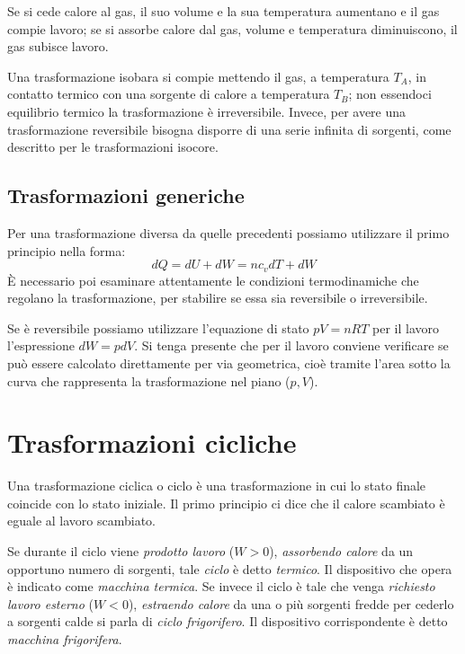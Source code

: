 \documentclass[class=book, crop=false, oneside, 12pt]{standalone}
\begin{document}
Se si cede calore al gas, il suo volume e la sua temperatura aumentano e il gas compie lavoro; se si assorbe calore dal gas, volume e temperatura diminuiscono, il gas subisce lavoro.

Una trasformazione isobara si compie mettendo il gas, a temperatura \(T_A\), in contatto termico con una sorgente di calore a temperatura \(T_B\); non essendoci equilibrio termico la trasformazione è irreversibile. 
Invece, per avere una trasformazione reversibile bisogna disporre di una serie infinita di sorgenti, come descritto per le trasformazioni isocore. 

\subsection{Trasformazioni generiche}

Per una trasformazione diversa da quelle precedenti possiamo utilizzare il primo principio nella forma:
\begin{equation}
    d Q = d U + d W = n c_v d T + d W
\end{equation}
È necessario poi esaminare attentamente le condizioni termodinamiche che regolano la trasformazione, per stabilire se essa sia reversibile o irreversibile.

Se è reversibile possiamo utilizzare l'equazione di stato \(p V= n R T\) per il lavoro l'espressione \(d W = p d V \). 
Si tenga presente che per il lavoro conviene verificare se può essere calcolato direttamente per via geometrica, cioè tramite l'area sotto la curva che rappresenta la trasformazione nel piano (\(p , V\)).

\section{Trasformazioni cicliche}

Una trasformazione ciclica o ciclo è una trasformazione in cui lo stato finale coincide con lo stato iniziale. 
Il primo principio ci dice che il calore scambiato è eguale al lavoro scambiato.

Se durante il ciclo viene \emph{prodotto lavoro} (\(W > 0 \)), \emph{assorbendo calore} da un opportuno numero di sorgenti, tale \emph{ciclo} è detto \emph{termico}. 
Il dispositivo che opera è indicato come \emph{macchina termica}. 
Se invece il ciclo è tale che venga \emph{richiesto lavoro esterno} (\(W < 0\)), \emph{estraendo calore} da una o più sorgenti fredde per cederlo a sorgenti calde si parla di \emph{ciclo frigorifero}. 
Il dispositivo corrispondente è detto \emph{macchina frigorifera}. 
\end{document}
